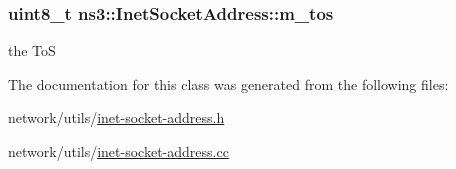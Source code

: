 \subsubsection[{\texorpdfstring{m\+\_\+tos}{m_tos}}]{\setlength{\rightskip}{0pt plus 5cm}uint8\+\_\+t ns3\+::\+Inet\+Socket\+Address\+::m\+\_\+tos\hspace{0.3cm}{\ttfamily [private]}}\hypertarget{classns3_1_1InetSocketAddress_ade08598c815f5639ddeee826ee23b6ca}{}\label{classns3_1_1InetSocketAddress_ade08598c815f5639ddeee826ee23b6ca}


the ToS 



The documentation for this class was generated from the following files\+:\begin{DoxyCompactItemize}
\item 
network/utils/\hyperlink{inet-socket-address_8h}{inet-\/socket-\/address.\+h}\item 
network/utils/\hyperlink{inet-socket-address_8cc}{inet-\/socket-\/address.\+cc}\end{DoxyCompactItemize}
